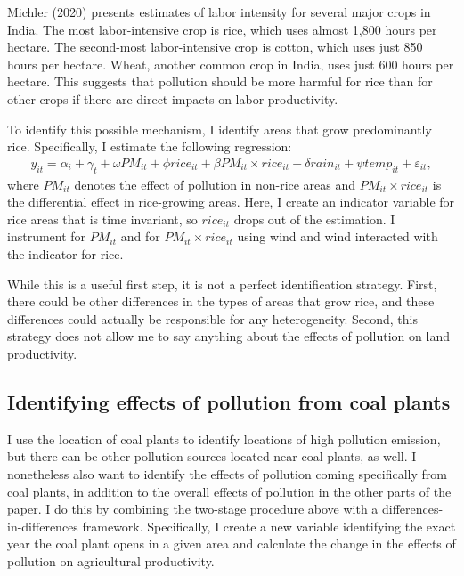\documentclass[
]{article}
\begin{document}
Michler (2020) presents estimates of labor intensity for several major crops in India. The most labor-intensive crop is rice, which uses almost 1,800 hours per hectare. The second-most labor-intensive crop is cotton, which uses just 850 hours per hectare. Wheat, another common crop in India, uses just 600 hours per hectare. This suggests that pollution should be more harmful for rice than for other crops if there are direct impacts on labor productivity.

To identify this possible mechanism, I identify areas that grow predominantly rice. Specifically, I estimate the following regression:
\begin{gather} 
y_{it} = \alpha_{i} + \gamma_{t} + \omega PM_{it} + \phi rice_{it} + \beta PM_{it}\times rice_{it} + \delta rain_{it} + \psi temp_{it} + \varepsilon_{it},
\end{gather}
where \(PM_{it}\) denotes the effect of pollution in non-rice areas and \(PM_{it}\times rice_{it}\) is the differential effect in rice-growing areas. Here, I create an indicator variable for rice areas that is time invariant, so \(rice_{it}\) drops out of the estimation. I instrument for \(PM_{it}\) and for \(PM_{it}\times rice_{it}\) using wind and wind interacted with the indicator for rice.

While this is a useful first step, it is not a perfect identification strategy. First, there could be other differences in the types of areas that grow rice, and these differences could actually be responsible for any heterogeneity. Second, this strategy does not allow me to say anything about the effects of pollution on land productivity.

\hypertarget{identifying-effects-of-pollution-from-coal-plants}{%
\subsection{Identifying effects of pollution from coal plants}\label{identifying-effects-of-pollution-from-coal-plants}}

I use the location of coal plants to identify locations of high pollution emission, but there can be other pollution sources located near coal plants, as well. I nonetheless also want to identify the effects of pollution coming specifically from coal plants, in addition to the overall effects of pollution in the other parts of the paper. I do this by combining the two-stage procedure above with a differences-in-differences framework. Specifically, I create a new variable identifying the exact year the coal plant opens in a given area and calculate the change in the effects of pollution on agricultural productivity.
\end{document}
